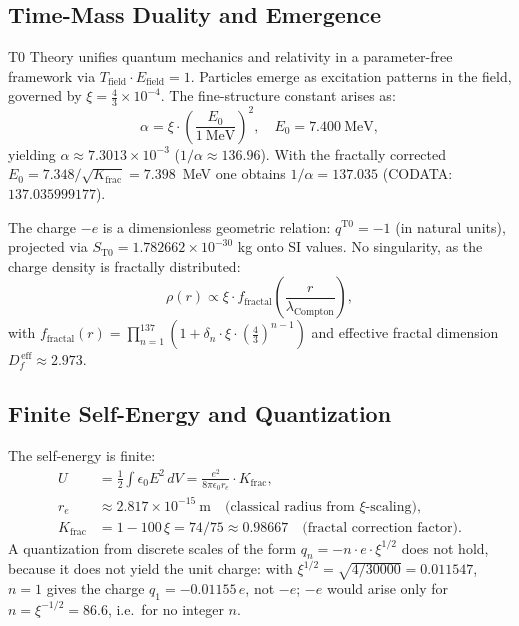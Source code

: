 	\subsection{Time-Mass Duality and Emergence}
	T0 Theory unifies quantum mechanics and relativity in a parameter-free framework via $T_{\text{field}} \cdot E_{\text{field}} = 1$. Particles emerge as excitation patterns in the field, governed by $\xi = \frac{4}{3} \times 10^{-4}$. The fine-structure constant arises as:
	\begin{equation}
		\alpha = \xi \cdot \left( \frac{E_0}{1~\mathrm{MeV}} \right)^2, \quad E_0 = 7.400~\mathrm{MeV},
	\end{equation}
	yielding $\alpha \approx 7.3013 \times 10^{-3}$ ($1/\alpha \approx 136.96$). With the fractally corrected $E_0 = 7.348/\sqrt{K_{\text{frac}}} = 7.398$~MeV one obtains $1/\alpha = 137.035$ (CODATA: $137.035999177$).
	
	The charge $-e$ is a dimensionless geometric relation: $q^{\mathrm{T0}} = -1$ (in natural units), projected via $S_{\mathrm{T0}} = 1.782662 \times 10^{-30}$ kg onto SI values. No singularity, as the charge density is fractally distributed:
	\begin{equation}
		\rho(r) \propto \xi \cdot f_{\text{fractal}}\left( \frac{r}{\lambda_{\text{Compton}}} \right),
	\end{equation}
	with $f_{\text{fractal}}(r) = \prod_{n=1}^{137} \left(1 + \delta_n \cdot \xi \cdot \left(\frac{4}{3}\right)^{n-1}\right)$ and effective fractal dimension $D_f^{\,\text{eff}} \approx 2.973$.
	
	\subsection{Finite Self-Energy and Quantization}
	The self-energy is finite:
	\begin{align}
		U &= \frac{1}{2} \int \epsilon_0 E^2 \, dV = \frac{e^2}{8\pi \epsilon_0 r_e} \cdot K_{\text{frac}}, \\
		r_e &\approx 2.817 \times 10^{-15}~\mathrm{m} \quad \text{(classical radius from $\xi$-scaling)}, \\
		K_{\text{frac}} &= 1 - 100\,\xi = 74/75 \approx 0.98667 \quad \text{(fractal correction factor)}.
	\end{align}
	A quantization from discrete scales of the form $q_n = -n \cdot e \cdot \xi^{1/2}$ does not hold, because it does not yield the unit charge: with $\xi^{1/2} = \sqrt{4/30000} = 0.011547$, $n = 1$ gives the charge $q_1 = -0.01155\,e$, not $-e$; $-e$ would arise only for $n = \xi^{-1/2} = 86.6$, i.e.\ for no integer $n$.
	
